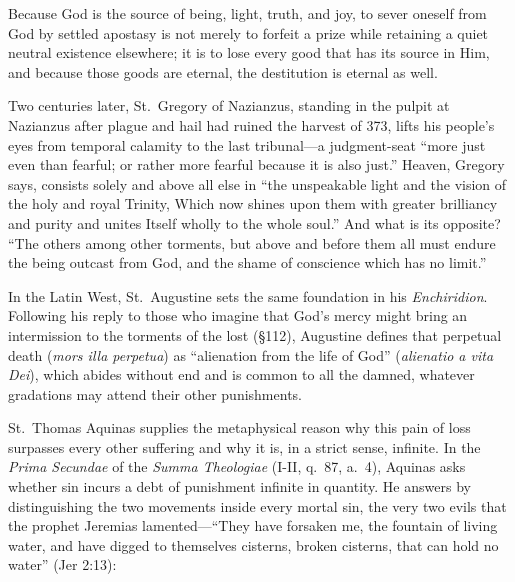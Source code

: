 Because God is the source of being, light, truth, and joy, to sever oneself from God by settled apostasy is not merely to forfeit a prize while retaining a quiet neutral existence elsewhere; it is to lose every good that has its source in Him, and because those goods are eternal, the destitution is eternal as well.

Two centuries later, St.\ Gregory of Nazianzus, standing in the pulpit at Nazianzus after plague and hail had ruined the harvest of 373, lifts his people's eyes from temporal calamity to the last tribunal---a judgment-seat ``more just even than fearful; or rather more fearful because it is also just.'' Heaven, Gregory says, consists solely and above all else in ``the unspeakable light and the vision of the holy and royal Trinity, Which now shines upon them with greater brilliancy and purity and unites Itself wholly to the whole soul.'' And what is its opposite? ``The others among other torments, but above and before them all must endure the being outcast from God, and the shame of conscience which has no limit.''

In the Latin West, St.\ Augustine sets the same foundation in his \textit{Enchiridion}. Following his reply to those who imagine that God's mercy might bring an intermission to the torments of the lost (\S 112), Augustine defines that perpetual death (\textit{mors illa perpetua}) as ``alienation from the life of God'' (\textit{alienatio a vita Dei}), which abides without end and is common to all the damned, whatever gradations may attend their other punishments.

St.\ Thomas Aquinas supplies the metaphysical reason why this pain of loss surpasses every other suffering and why it is, in a strict sense, infinite. In the \textit{Prima Secundae} of the \textit{Summa Theologiae} (I-II, q.\ 87, a.\ 4), Aquinas asks whether sin incurs a debt of punishment infinite in quantity. He answers by distinguishing the two movements inside every mortal sin, the very two evils that the prophet Jeremias lamented---``They have forsaken me, the fountain of living water, and have digged to themselves cisterns, broken cisterns, that can hold no water'' (Jer 2:13):

